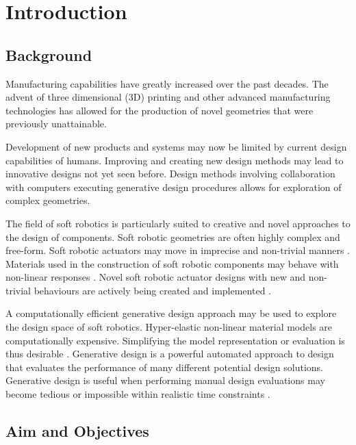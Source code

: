\chapter{Introduction}
\label{chp:I}


\section{Background}

Manufacturing capabilities have greatly increased over the past decades. The advent of three dimensional (3D) printing and other advanced manufacturing technologies has allowed for the production of novel geometries that were previously unattainable. \cite{Buchanan2019,Luis2020}

Development of new products and systems may now be limited by current design capabilities of humans. Improving and creating new design methods may lead to innovative designs not yet seen before. Design methods involving collaboration with computers executing generative design procedures allows for exploration of complex geometries. \cite{Shea2005}

The field of soft robotics is particularly suited to creative and novel approaches to the design of components. Soft robotic geometries are often highly complex and free-form. Soft robotic actuators may move in imprecise and non-trivial manners \cite{Whitesides2018}. Materials used in the construction of soft robotic components may behave with non-linear responses \cite{Boyraz2018}. Novel soft robotic actuator designs with new and non-trivial behaviours are actively being created and implemented \cite{Ellis2020}.

A computationally efficient generative design approach may be used to explore the design space of soft robotics. Hyper-elastic non-linear material models are computationally expensive. Simplifying the model representation or evaluation is thus desirable \cite{Niroomandi2010}. Generative design is a powerful automated approach to design that evaluates the performance of many different potential design solutions. Generative design is useful when performing manual design evaluations may become tedious or impossible within realistic time constraints \cite{Brose1993}.

\section{Aim and Objectives}

